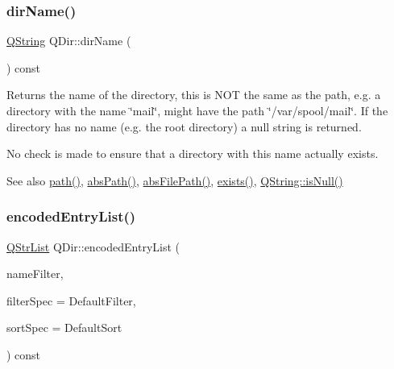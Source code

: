 \subsubsection{\texorpdfstring{dirName()}{dirName()}}
{\footnotesize\ttfamily \mbox{\hyperlink{class_q_string}{Q\+String}} Q\+Dir\+::dir\+Name (\begin{DoxyParamCaption}{ }\end{DoxyParamCaption}) const\hspace{0.3cm}{\ttfamily [virtual]}}

Returns the name of the directory, this is N\+OT the same as the path, e.\+g. a directory with the name \char`\"{}mail\char`\"{}, might have the path \char`\"{}/var/spool/mail\char`\"{}. If the directory has no name (e.\+g. the root directory) a null string is returned.

No check is made to ensure that a directory with this name actually exists.

\begin{DoxySeeAlso}{See also}
\mbox{\hyperlink{class_q_dir_a6258e0803c991909e0ce38e40f6f07ec}{path()}}, \mbox{\hyperlink{class_q_dir_a1464e556606a3223b8db1b3629c41cb7}{abs\+Path()}}, \mbox{\hyperlink{class_q_dir_aca84b0a728bc2b88c3ab55cbed6e18c4}{abs\+File\+Path()}}, \mbox{\hyperlink{class_q_dir_a97e8132d482e374745230de942def208}{exists()}}, \mbox{\hyperlink{class_q_string_a6a6da156364a32ef91e35f83b1955acc}{Q\+String\+::is\+Null()}} 
\end{DoxySeeAlso}
\mbox{\label{class_q_dir_a13b33b84ec9533c9649887a2577badd9}} 
\subsubsection{\texorpdfstring{encodedEntryList()}{encodedEntryList()}\hspace{0.1cm}{\footnotesize\ttfamily [1/2]}}
{\footnotesize\ttfamily \mbox{\hyperlink{class_q_str_list}{Q\+Str\+List}} Q\+Dir\+::encoded\+Entry\+List (\begin{DoxyParamCaption}\item[{const \mbox{\hyperlink{class_q_string}{Q\+String}} \&}]{name\+Filter,  }\item[{int}]{filter\+Spec = {\ttfamily DefaultFilter},  }\item[{int}]{sort\+Spec = {\ttfamily DefaultSort} }\end{DoxyParamCaption}) const\hspace{0.3cm}{\ttfamily [virtual]}}

